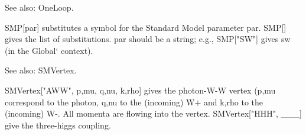 See also:  OneLoop.



SMP[par] substitutes a symbol for the { }Standard Model parameter par. { }SMP[] gives the list of substitutions. par should be a string;
  e.g., SMP["SW"] gives { }sw (in the Global` context).



See also: SMVertex.






SMVertex["AWW", p,mu, q,nu, k,rho] gives the photon-W-W vertex (p,mu correspond to the photon, q,nu to the (incoming) W\(+\) and k,rho to
  the (incoming) W-. All momenta are flowing into the vertex. { }SMVertex["HHH", \_{}\_{}\_{}] give the three-higgs coupling.



